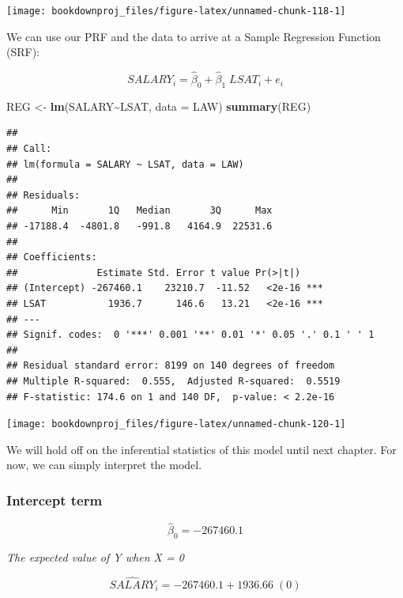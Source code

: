 \documentclass[
]{book}
\newenvironment{Shaded}{\begin{snugshade}}{\end{snugshade}}
\newcommand{\AttributeTok}[1]{\textcolor[rgb]{0.13,0.29,0.53}{#1}}
\newcommand{\FunctionTok}[1]{\textcolor[rgb]{0.13,0.29,0.53}{\textbf{#1}}}
\newcommand{\NormalTok}[1]{#1}
\newcommand{\OtherTok}[1]{\textcolor[rgb]{0.56,0.35,0.01}{#1}}
\newcommand{\SpecialCharTok}[1]{\textcolor[rgb]{0.81,0.36,0.00}{\textbf{#1}}}
\begin{document}
\begin{center}\texttt{[image: bookdownproj\_files/figure-latex/unnamed-chunk-118-1]} \end{center}

We can use our PRF and the data to arrive at a Sample Regression Function (SRF):

\[SALARY_i = \hat\beta_0 + \hat\beta_1 \; LSAT_i + e_i\]

\begin{Shaded}
\begin{Highlighting}[]
\NormalTok{REG }\OtherTok{\textless{}{-}} \FunctionTok{lm}\NormalTok{(SALARY}\SpecialCharTok{\textasciitilde{}}\NormalTok{LSAT, }\AttributeTok{data =}\NormalTok{ LAW)}
\FunctionTok{summary}\NormalTok{(REG)}
\end{Highlighting}
\end{Shaded}

\begin{verbatim}
## 
## Call:
## lm(formula = SALARY ~ LSAT, data = LAW)
## 
## Residuals:
##      Min       1Q   Median       3Q      Max 
## -17188.4  -4801.8   -991.8   4164.9  22531.6 
## 
## Coefficients:
##              Estimate Std. Error t value Pr(>|t|)    
## (Intercept) -267460.1    23210.7  -11.52   <2e-16 ***
## LSAT           1936.7      146.6   13.21   <2e-16 ***
## ---
## Signif. codes:  0 '***' 0.001 '**' 0.01 '*' 0.05 '.' 0.1 ' ' 1
## 
## Residual standard error: 8199 on 140 degrees of freedom
## Multiple R-squared:  0.555,  Adjusted R-squared:  0.5519 
## F-statistic: 174.6 on 1 and 140 DF,  p-value: < 2.2e-16
\end{verbatim}

\begin{center}\texttt{[image: bookdownproj\_files/figure-latex/unnamed-chunk-120-1]} \end{center}

We will hold off on the inferential statistics of this model until next chapter. For now, we can simply interpret the model.

\subsubsection*{Intercept term}\label{intercept-term}

\[\hat\beta_0 = -267460.1\]

\medskip

\emph{The expected value of Y when X = 0}

\[\widehat{SALARY}_i = -267460.1 + 1936.66 \; (0)\]
\end{document}
